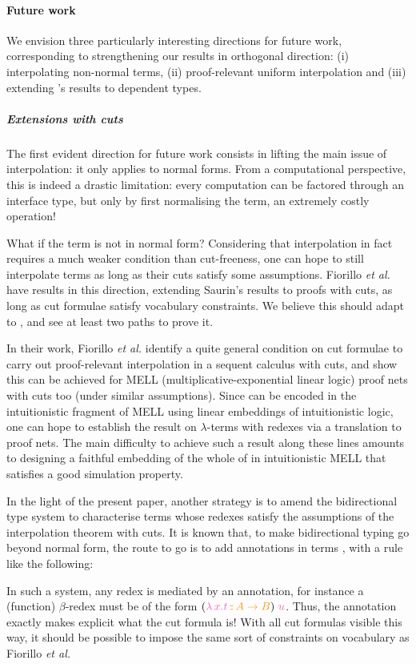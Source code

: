 \documentclass[a4paper,UKenglish,cleveref, autoref, thm-restate]{lipics-v2021}
\begin{document}
\paragraph*{Future work}

We envision three particularly interesting directions for future work, corresponding to strengthening our results in orthogonal direction: (i) interpolating non-normal terms, (ii) proof-relevant uniform interpolation and (iii) extending \Cubric's results to dependent types. 

\subparagraph*{Extensions with cuts}
The first evident direction for future work consists in lifting the main issue of
\Cubric interpolation: it only applies to normal forms. From a computational perspective,
this is indeed a drastic limitation: every computation can be factored through an interface type,
but only by first normalising the term, an extremely costly operation!

What if the term is not in normal form? 
Considering that interpolation in fact requires a much weaker condition than
cut-freeness, one can hope to still interpolate terms as long as their
cuts satisfy some assumptions. 
Fiorillo {\it et al.}~\cite{Fiorillo2025} have results in this direction,
extending Saurin's \cite{Saurin25fscd}
results to proofs with cuts, as long as cut formulae satisfy vocabulary constraints.
We believe this should adapt to \stlcp, and see at least two paths to prove it.

In their work, Fiorillo {\it et al.} identify a quite general condition on cut formulae
to carry out proof-relevant interpolation in a sequent calculus with cuts, and show this can be achieved for MELL (multiplicative-exponential linear logic) proof nets with cuts too (under similar assumptions). Since \stlcp can be encoded in the intuitionistic fragment of MELL using linear embeddings of intuitionistic logic, one can hope to establish the result on $\lambda$-terms with redexes via a translation to proof nets. The main difficulty to achieve such a result along these lines amounts to designing a faithful embedding of the whole of \stlcp in intuitionistic MELL that satisfies a good simulation property.

In the light of the present paper, another strategy is to amend the bidirectional type system to characterise terms whose redexes satisfy the assumptions of the interpolation theorem with cuts. It is known that, to make
bidirectional typing go beyond normal form, the route to go is
to add annotations in terms \cite{McBride2022,Gratzer2019}, with a rule like the following:
\begin{mathpar}
\end{mathpar}
In such a system, any redex is mediated by an annotation, for instance a (function)
\(\beta\)-redex must be of the form \((\annot{\l x.t}{A \to B})~\ccol{u}\). Thus,
the annotation exactly makes explicit what the cut formula is! With all cut formulas
visible this way, it should be possible to impose the same sort of
constraints on vocabulary as Fiorillo \textit{et al.}
\end{document}
